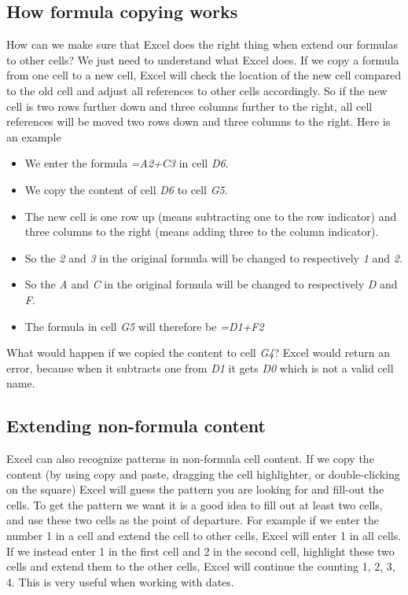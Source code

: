 \documentclass[]{book}
\providecommand{\tightlist}{%
  \setlength{\itemsep}{0pt}\setlength{\parskip}{0pt}}
\begin{document}
\hypertarget{how-formula-copying-works}{%
\subsection{How formula copying works}\label{how-formula-copying-works}}

How can we make sure that Excel does the right thing when extend our formulas to other cells? We just need to understand what Excel does. If we copy a formula from one cell to a new cell, Excel will check the location of the new cell compared to the old cell and adjust all references to other cells accordingly. So if the new cell is two rows further down and three columns further to the right, all cell references will be moved two rows down and three columns to the right. Here is an example

\begin{itemize}
\tightlist
\item
  We enter the formula \emph{=A2+C3} in cell \emph{D6}.
\item
  We copy the content of cell \emph{D6} to cell \emph{G5}.
\item
  The new cell is one row up (means subtracting one to the row indicator) and three columns to the right (means adding three to the column indicator).
\item
  So the \emph{2} and \emph{3} in the original formula will be changed to respectively \emph{1} and \emph{2}.
\item
  So the \emph{A} and \emph{C} in the original formula will be changed to respectively \emph{D} and \emph{F}.
\item
  The formula in cell \emph{G5} will therefore be \emph{=D1+F2}
\end{itemize}

What would happen if we copied the content to cell \emph{G4}? Excel would return an error, because when it subtracts one from \emph{D1} it gets \emph{D0} which is not a valid cell name.

\hypertarget{extending-non-formula-content}{%
\subsection{Extending non-formula content}\label{extending-non-formula-content}}

Excel can also recognize patterns in non-formula cell content. If we copy the content (by using copy and paste, dragging the cell highlighter, or double-clicking on the square) Excel will guess the pattern you are looking for and fill-out the cells. To get the pattern we want it is a good idea to fill out at least two cells, and use these two cells as the point of departure. For example if we enter the number 1 in a cell and extend the cell to other cells, Excel will enter 1 in all cells. If we instead enter 1 in the first cell and 2 in the second cell, highlight these two cells and extend them to the other cells, Excel will continue the counting 1, 2, 3, 4. This is very useful when working with dates.
\end{document}
